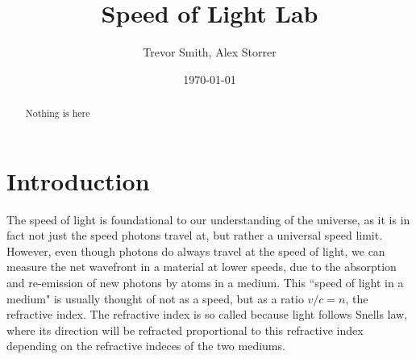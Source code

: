 \documentclass[aps,prl,reprint]{revtex4-2}
\begin{document}

\title{Speed of Light Lab}


\author{Trevor Smith, Alex Storrer}


\date{\today}

\begin{abstract}
	Nothing is here
\end{abstract}


\maketitle

\section{Introduction}
The speed of light is foundational to our understanding of the universe, as it is in
fact not just the speed photons travel at, but rather a universal speed limit. 
However, even though photons do always travel at the speed of light, we can measure 
the net wavefront in a material at lower speeds, due to the absorption and re-emission
of new photons by atoms in a medium. This ``speed of light in a medium" is usually
thought of not as a speed, but as a ratio $v/c=n$, the refractive index. The 
refractive index is so called because light follows Snells law, where its direction
will be refracted proportional to this refractive index depending on the refractive
indeces of the two mediums.\\
\end{document}
